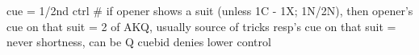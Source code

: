 cue = 1/2nd ctrl
# if opener shows a suit (unless 1C - 1X; 1N/2N), then
opener's cue on that suit = 2 of AKQ, usually source of tricks
resp's cue on that suit = never shortness, can be Q
cuebid denies lower control